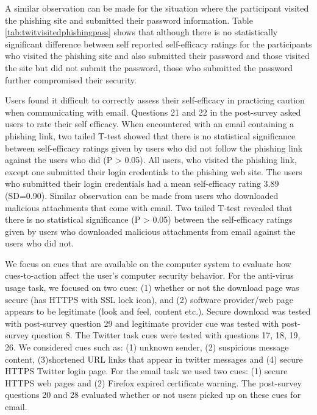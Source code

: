 A similar observation can be made for the situation where the participant visited the phishing site and submitted their password information. Table \ref{tab:twitvisitedphishingpass} shows that although there is no statistically significant difference between self reported self-efficacy ratings for the participants who visited the phishing site and also submitted their password and those visited the site but did not submit the password, those who submitted the password further compromised their security. 

Users found it difficult to correctly assess their self-efficacy in practicing caution when communicating with email. Questions 21 and 22 in the post-survey asked users to rate their self efficacy. When encountered with an email containing a phishing link, two tailed T-test showed that there is no statistical significance between self-efficacy ratings given by users who did not follow the phishing link against the users who did (P > 0.05). All users, who visited the phishing link, except one submitted their login credentials to the phishing web site. The users who submitted their login credentials had a mean self-efficacy rating 3.89 (SD=0.90). Similar observation can be made from users who downloaded malicious attachments that come with email. Two tailed T-test revealed that there is no statistical significance (P > 0.05) between the self-efficacy ratings given by users who downloaded malicious attachments  from email against the users who did not.

We focus on cues that are available on the computer system to evaluate how cues-to-action affect the user's computer security behavior. For the anti-virus usage task, we focused on two cues: (1) whether or not the download page was secure (has HTTPS with SSL lock icon), and (2) software provider/web page appears to be legitimate (look and feel, content etc.). Secure download was tested with post-survey question 29 and legitimate provider cue was tested with post-survey question 8. The Twitter task cues were tested with questions 17, 18, 19, 26. We considered cues such as: (1) unknown sender, (2) suspicious message content, (3)shortened URL links that appear in twitter messages and (4) secure HTTPS Twitter login page. For the email task we used two cues: (1) secure HTTPS web pages and (2) Firefox expired certificate warning. The post-survey questions 20 and 28 evaluated whether or not users picked up on these cues for email.

